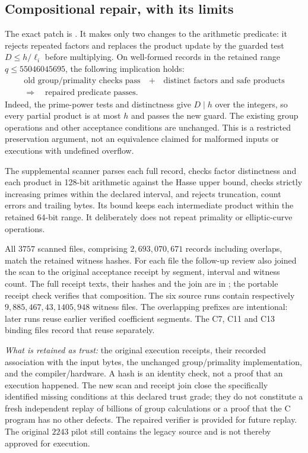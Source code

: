 \subsection{Compositional repair, with its limits}
The exact patch is . It makes only two changes to the arithmetic predicate: it rejects repeated factors and replaces the product update by the guarded test $D\le h/\ell_i$ before multiplying. On well-formed records in the retained range $q\le55046045695$, the following implication holds:
\[
\begin{gathered}
\text{old group/primality checks pass}
\quad+\quad\text{distinct factors and safe products}\\
\Longrightarrow\quad\text{repaired predicate passes}.
\end{gathered}
\]
Indeed, the prime-power tests and distinctness give $D\mid h$ over the integers, so every partial product is at most $h$ and passes the new guard. The existing group operations and other acceptance conditions are unchanged. This is a restricted preservation argument, not an equivalence claimed for malformed inputs or executions with undefined overflow.

The supplemental scanner parses each full record, checks factor distinctness and each product in 128-bit arithmetic against the Hasse upper bound, checks strictly increasing primes within the declared interval, and rejects truncation, count errors and trailing bytes. Its bound keeps each intermediate product within the retained 64-bit range. It deliberately does not repeat primality or elliptic-curve operations.

All $3757$ scanned files, comprising $2{,}693{,}070{,}671$ records including overlaps, match the retained witness hashes. For each file the follow-up review also joined the scan to the original acceptance receipt by segment, interval and witness count. The full receipt texts, their hashes and the join are in
; the portable receipt check verifies that composition. The six source runs contain respectively $9,885,467,43,1405,948$ witness files. The overlapping prefixes are intentional: later runs reuse earlier verified coefficient segments. The C7, C11 and C13 binding files record that reuse separately.

\emph{What is retained as trust:} the original execution receipts, their recorded association with the input bytes, the unchanged group/primality implementation, and the compiler/hardware. A hash is an identity check, not a proof that an execution happened. The new scan and receipt join close the specifically identified missing conditions at this declared trust grade; they do not constitute a fresh independent replay of billions of group calculations or a proof that the C program has no other defects. The repaired verifier is provided for future replay. The original $2243$ pilot still contains the legacy source and is not thereby approved for execution.

